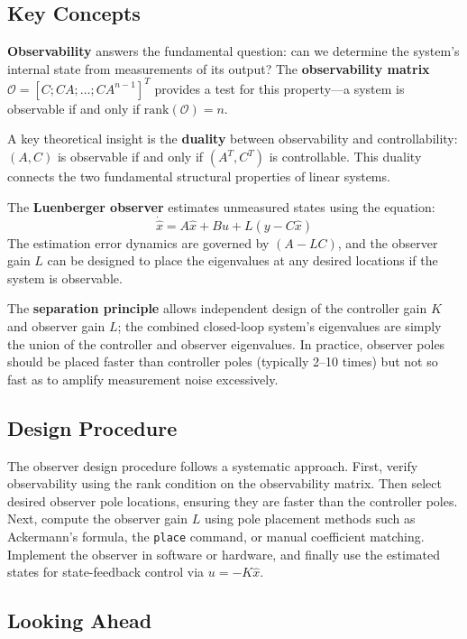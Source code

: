 \subsection{Key Concepts}

\textbf{Observability} answers the fundamental question: can we determine the system's internal state from measurements of its output? The \textbf{observability matrix} $\mathcal{O} = [C; CA; \ldots; CA^{n-1}]^T$ provides a test for this property---a system is observable if and only if $\text{rank}(\mathcal{O}) = n$.

A key theoretical insight is the \textbf{duality} between observability and controllability: $(A, C)$ is observable if and only if $(A^T, C^T)$ is controllable. This duality connects the two fundamental structural properties of linear systems.

The \textbf{Luenberger observer} estimates unmeasured states using the equation:
\begin{equation}
\dot{\hat{x}} = A\hat{x} + Bu + L(y - C\hat{x})
\end{equation}
The estimation error dynamics are governed by $(A - LC)$, and the observer gain $L$ can be designed to place the eigenvalues at any desired locations if the system is observable.

The \textbf{separation principle} allows independent design of the controller gain $K$ and observer gain $L$; the combined closed-loop system's eigenvalues are simply the union of the controller and observer eigenvalues. In practice, observer poles should be placed faster than controller poles (typically 2--10 times) but not so fast as to amplify measurement noise excessively.

\subsection{Design Procedure}

The observer design procedure follows a systematic approach. First, verify observability using the rank condition on the observability matrix. Then select desired observer pole locations, ensuring they are faster than the controller poles. Next, compute the observer gain $L$ using pole placement methods such as Ackermann's formula, the \texttt{place} command, or manual coefficient matching. Implement the observer in software or hardware, and finally use the estimated states for state-feedback control via $u = -K\hat{x}$.

\subsection{Looking Ahead}

